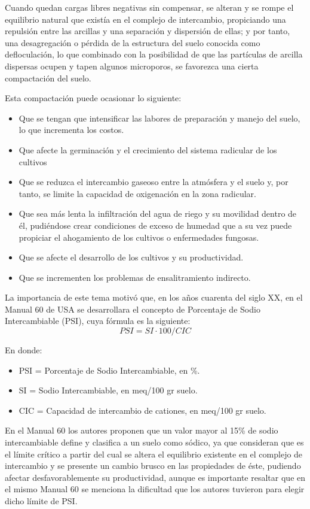 Cuando quedan cargas libres negativas sin compensar, se alteran y se rompe el equilibrio natural que existía en el complejo de intercambio, propiciando una repulsión entre las arcillas y una separación y dispersión de ellas; y por tanto, una desagregación o pérdida de la estructura del suelo conocida como defloculación, lo que combinado con la posibilidad de que las partículas de arcilla dispersas ocupen y tapen algunos microporos, se favorezca una cierta compactación del suelo.

Esta compactación puede ocasionar lo siguiente:
\begin{itemize}
\item Que se tengan que intensificar las labores de preparación y manejo del suelo, lo que incrementa los costos.
\item Que afecte la germinación y el crecimiento del sistema radicular de los cultivos
\item Que se reduzca el intercambio gaseoso entre la atmósfera y el suelo y, por tanto, se limite la capacidad de oxigenación en la zona radicular.
\item Que sea más lenta la infiltración del agua de riego y su movilidad dentro de él, pudiéndose crear condiciones de exceso de humedad que a su vez puede propiciar el ahogamiento de los cultivos o enfermedades fungosas.
\item Que se afecte el desarrollo de los cultivos y su productividad.
\item Que se incrementen los problemas de ensalitramiento indirecto.
\end{itemize}
La importancia de este tema motivó que, en los años cuarenta del siglo XX, en el
Manual 60 de USA se desarrollara el concepto de Porcentaje de Sodio
Intercambiable (PSI), cuya fórmula es la siguiente:
\begin{equation}
PSI = SI \cdot 100/CIC
\end{equation}
\begin{notation}
En donde:
\begin{itemize}
\item PSI = Porcentaje de Sodio Intercambiable, en \%.
\item  SI = Sodio Intercambiable, en meq/100 gr suelo.
\item  CIC = Capacidad de intercambio de cationes, en meq/100 gr suelo.
\end{itemize}
\end{notation}
En el Manual 60 los autores proponen que un valor mayor al 15\% de sodio intercambiable define y clasifica a un suelo como sódico, ya que consideran que es el límite crítico a partir del cual se altera el equilibrio existente en el complejo de intercambio y se presente un cambio brusco en las propiedades de éste, pudiendo afectar desfavorablemente su productividad, aunque es importante resaltar que en el mismo Manual 60 se menciona la dificultad que los autores tuvieron para elegir dicho límite de PSI.

